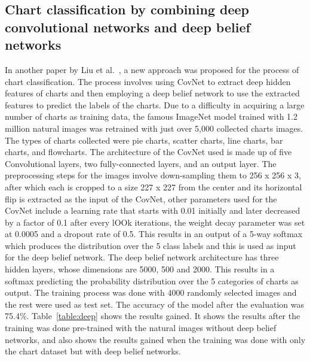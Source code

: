\documentclass[12pt, a4paper,oneside]{report}
\begin{document}
\subsection{Chart classification by combining deep convolutional networks and deep belief networks}
In another paper by Liu et al.~\cite{liu2015chart}, a new approach was proposed for the process of chart classification. The process involves using CovNet to extract deep hidden features of charts and then employing a deep belief network to use the extracted features to predict the labels of the charts. Due to a difficulty in acquiring a large number of charts as training data, the famous ImageNet model trained with 1.2 million natural images was retrained with just over 5,000 collected charts images. The types of charts collected were pie charts, scatter charts, line charts, bar charts, and flowcharts. The architecture of the CovNet used is made up of five Convolutional layers, two fully-connected layers, and an output layer. The preprocessing steps for the images involve down-sampling them to 256 x 256 x 3, after which each is cropped to a size 227 x 227 from the center and its horizontal flip is extracted as the input of the CovNet, other parameters used for the CovNet include a learning rate that starts with 0.01 initially and later decreased by a factor of 0.1 after every lOOk iterations, the weight decay parameter was set at 0.0005 and a dropout rate of 0.5. This results in an output of a 5-way softmax which produces the distribution over the 5 class labels and this is used as input for the deep belief network. The deep belief network architecture has three hidden layers, whose dimensions are 5000, 500 and 2000. This results in a softmax predicting the probability distribution over the 5 categories of charts as output. The training process was done with 4000 randomly selected images and the rest were used as test set. The accuracy of the model after the evaluation was 75.4\%. Table~\ref{table:deep} shows the results gained. It shows the results after the training was done pre-trained with the natural images without deep belief networks, and also shows the results gained when the training was done with only the chart dataset but with deep belief networks.
\end{document}
